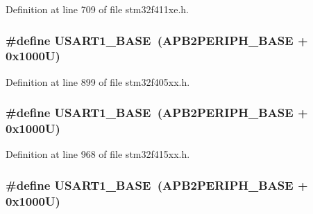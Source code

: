 Definition at line 709 of file stm32f411xe.\+h.

\subsubsection[{\texorpdfstring{U\+S\+A\+R\+T1\+\_\+\+B\+A\+SE}{USART1_BASE}}]{\setlength{\rightskip}{0pt plus 5cm}\#define U\+S\+A\+R\+T1\+\_\+\+B\+A\+SE~({\bf A\+P\+B2\+P\+E\+R\+I\+P\+H\+\_\+\+B\+A\+SE} + 0x1000\+U)}\hypertarget{group___peripheral__registers__structures_ga86162ab3f740db9026c1320d46938b4d}{}\label{group___peripheral__registers__structures_ga86162ab3f740db9026c1320d46938b4d}


Definition at line 899 of file stm32f405xx.\+h.

\subsubsection[{\texorpdfstring{U\+S\+A\+R\+T1\+\_\+\+B\+A\+SE}{USART1_BASE}}]{\setlength{\rightskip}{0pt plus 5cm}\#define U\+S\+A\+R\+T1\+\_\+\+B\+A\+SE~({\bf A\+P\+B2\+P\+E\+R\+I\+P\+H\+\_\+\+B\+A\+SE} + 0x1000\+U)}\hypertarget{group___peripheral__registers__structures_ga86162ab3f740db9026c1320d46938b4d}{}\label{group___peripheral__registers__structures_ga86162ab3f740db9026c1320d46938b4d}


Definition at line 968 of file stm32f415xx.\+h.

\subsubsection[{\texorpdfstring{U\+S\+A\+R\+T1\+\_\+\+B\+A\+SE}{USART1_BASE}}]{\setlength{\rightskip}{0pt plus 5cm}\#define U\+S\+A\+R\+T1\+\_\+\+B\+A\+SE~({\bf A\+P\+B2\+P\+E\+R\+I\+P\+H\+\_\+\+B\+A\+SE} + 0x1000\+U)}\hypertarget{group___peripheral__registers__structures_ga86162ab3f740db9026c1320d46938b4d}{}\label{group___peripheral__registers__structures_ga86162ab3f740db9026c1320d46938b4d}


